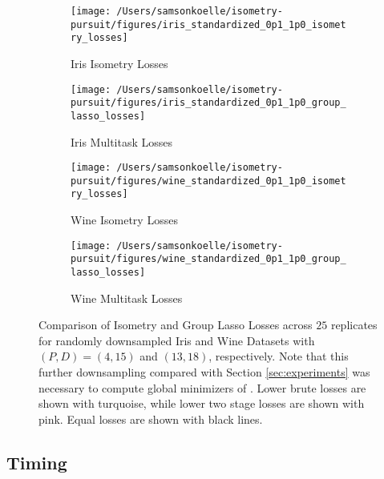 \begin{figure}[t] %
    \centering
    \begin{subfigure}[b]{0.45\textwidth}
        \centering
        \texttt{[image: /Users/samsonkoelle/isometry-pursuit/figures/iris\_standardized\_0p1\_1p0\_isometry\_losses]}
        \caption{Iris Isometry Losses}
        \label{fig:iris_isometry_losses}
    \end{subfigure}
    \hfill
    \begin{subfigure}[b]{0.45\textwidth}
        \centering
        \texttt{[image: /Users/samsonkoelle/isometry-pursuit/figures/iris\_standardized\_0p1\_1p0\_group\_lasso\_losses]}
        \caption{Iris Multitask Losses}
        \label{fig:iris_group_lasso_losses}
    \end{subfigure}

    \vspace{0.5cm} %

    \begin{subfigure}[b]{0.45\textwidth}
        \centering
        \texttt{[image: /Users/samsonkoelle/isometry-pursuit/figures/wine\_standardized\_0p1\_1p0\_isometry\_losses]}
        \caption{Wine Isometry Losses}
        \label{fig:wine_isometry_losses}
    \end{subfigure}
    \hfill
    \begin{subfigure}[b]{0.45\textwidth}
        \centering
        \texttt{[image: /Users/samsonkoelle/isometry-pursuit/figures/wine\_standardized\_0p1\_1p0\_group\_lasso\_losses]}
        \caption{Wine Multitask Losses}
        \label{fig:wine_group_lasso_losses}
    \end{subfigure}
    \caption{Comparison of Isometry and Group Lasso Losses across $25$ replicates for randomly downsampled Iris and Wine Datasets with $(P,D) = (4,15)$ and $(13, 18)$, respectively.
    Note that this further downsampling compared with Section \ref{sec:experiments} was necessary to compute global minimizers of \brute.
    Lower brute losses are shown with turquoise, while lower two stage losses are shown with pink.
    Equal losses are shown with black lines.}
    \label{fig:comparison_losses}
\end{figure}

\newpage

\subsection{Timing}
\label{sec:timing}

